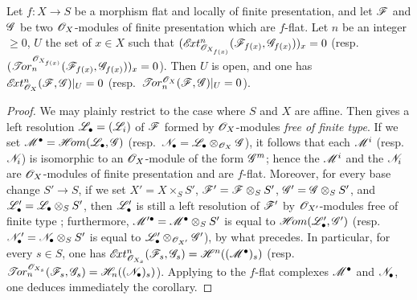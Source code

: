 \begin{corollary}[12.3.4]
\label{IV.12.3.4}
Let $f:X\to S$ be a morphism flat and locally of finite presentation, and let $\mathscr{F}$ and $\mathscr{G}$ be two $\mathscr{O}_X$-modules of finite presentation which are $f$-flat.
Let $n$ be an integer $\geq 0$, $U$ the set of $x\in X$ such that $(\mathscr{E}\!xt^n_{\mathscr{O}_{X_{f(x)}}}(\mathscr{F}_{f(x)},\mathscr{G}_{f(x)}))_x=0$ (resp.\ $(\mathscr{T}\!or_n^{\mathscr{O}_{X_{f(x)}}}(\mathscr{F}_{f(x)},\mathscr{G}_{f(x)}))_x=0$).
Then $U$ is open, and one has
$\mathscr{E}\!xt^n_{\mathscr{O}_X}(\mathscr{F},\mathscr{G})|_U=0$
(resp.\ $\mathscr{T}\!or_n^{\mathscr{O}_X}(\mathscr{F},\mathscr{G})|_U=0$).
\end{corollary}

\begin{proof}
We may plainly restrict to the case where $S$ and $X$ are affine.
Then  gives a left resolution $\mathscr{L}_\bullet=(\mathscr{L}_i)$ of $\mathscr{F}$ formed by $\mathscr{O}_X$-modules \emph{free of finite type}.
If we set $\mathscr{M}^\bullet=\mathscr{H}\!om(\mathscr{L}_\bullet,\mathscr{G})$ (resp.\ $\mathscr{N}_\bullet=\mathscr{L}_\bullet\otimes_{\mathscr{O}_X}\mathscr{G}$), it follows that each $\mathscr{M}^i$ (resp.\ $\mathscr{N}_i$) is isomorphic to an $\mathscr{O}_X$-module of the form $\mathscr{G}^m$; hence the $\mathscr{M}^i$ and the $\mathscr{N}_i$ are $\mathscr{O}_X$-modules of finite presentation and are $f$-flat.
Moreover, for every base change $S'\to S$, if we set
$X'=X\times_S S'$, $\mathscr{F}'=\mathscr{F}\otimes_S S'$, $\mathscr{G}'=\mathscr{G}\otimes_S S'$, and
$\mathscr{L}'_\bullet=\mathscr{L}_\bullet\otimes_S S'$, then $\mathscr{L}'_\bullet$ is still a left resolution of $\mathscr{F}'$ by $\mathscr{O}_{X'}$-modules free of finite type ; furthermore,
$\mathscr{M}'^\bullet=\mathscr{M}^\bullet\otimes_S S'$ is equal to $\mathscr{H}\!om(\mathscr{L}'_\bullet,\mathscr{G}')$
(resp.\ $\mathscr{N}'_\bullet=\mathscr{N}_\bullet\otimes_S S'$ is equal to $\mathscr{L}'_\bullet\otimes_{\mathscr{O}_{X'}}\mathscr{G}'$), by what precedes.
In particular, for every $s\in S$, one has
$\mathscr{E}\!xt^n_{\mathscr{O}_{X_s}}(\mathscr{F}_s,\mathscr{G}_s)=\mathscr{H}^n((\mathscr{M}^\bullet)_s)$
(resp.\ $\mathscr{T}\!or_n^{\mathscr{O}_{X_s}}(\mathscr{F}_s,\mathscr{G}_s)=\mathscr{H}_n((\mathscr{N}_\bullet)_s)$).
Applying  to the $f$-flat complexes $\mathscr{M}^\bullet$ and $\mathscr{N}_\bullet$, one deduces immediately the corollary.
\end{proof}
